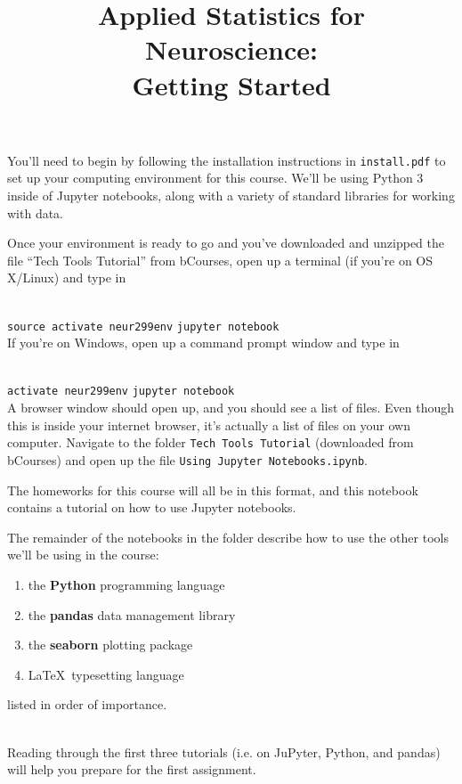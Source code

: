 \documentclass[twoside]{article}
\title{Applied Statistics for Neuroscience:\\
	Getting Started}
\begin{document}
\maketitle

You'll need to begin by following the installation instructions in
\texttt{install.pdf}
to set up your computing environment for this course.
We'll be using Python 3 inside of Jupyter notebooks,
along with a variety of standard libraries for working with data.

Once your environment is ready to go
and you've downloaded and unzipped
the file ``Tech Tools Tutorial'' from bCourses,
open up a terminal (if you're on OS X/Linux)
and type in

\ \\
\texttt{source activate neur299env}
\texttt{jupyter notebook}
\ \\

If you're on Windows, open up a
command prompt window
and type in

\ \\
\texttt{activate neur299env}
\texttt{jupyter notebook}
\ \\

A browser window should open up, and you should see a list of files.
Even though this is inside your internet browser,
it's actually a list of files on your own computer.
Navigate to the folder \texttt{Tech Tools Tutorial}
(downloaded from bCourses)
and open up the file
\texttt{Using Jupyter Notebooks.ipynb}.

The homeworks for this course will all be in this format,
and this notebook contains a tutorial on how to use Jupyter notebooks.

The remainder of the notebooks in the folder describe how
to use the other tools we'll be using in the course:

\begin{enumerate}
\item the \textbf{Python} programming language
\item the \textbf{pandas} data management library
\item the \textbf{seaborn} plotting package
\item \LaTeX \ typesetting language
\end{enumerate}

listed in order of importance.

\ \\

Reading through the first three tutorials
(i.e. on JuPyter, Python, and pandas)
will help you prepare for the first assignment.
\end{document}
